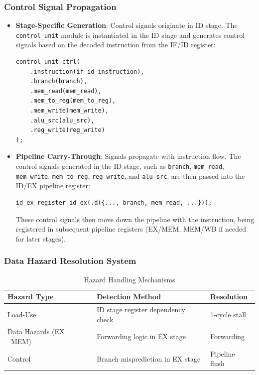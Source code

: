 \documentclass{article}
\numberwithin{figure}{section}
\numberwithin{table}{section}
\begin{document}
\subsubsection{Control Signal Propagation}
\begin{itemize}
\item \textbf{Stage-Specific Generation}: Control signals originate in ID stage. The \texttt{control\_unit} module is instantiated in the ID stage and generates control signals based on the decoded instruction from the IF/ID register:
\begin{lstlisting}[style=verilog-style]
control_unit ctrl(
    .instruction(if_id_instruction),
    .branch(branch),
    .mem_read(mem_read),
    .mem_to_reg(mem_to_reg),
    .mem_write(mem_write),
    .alu_src(alu_src),
    .reg_write(reg_write)
);\end{lstlisting}

\item \textbf{Pipeline Carry-Through}: Signals propagate with instruction flow. The control signals generated in the ID stage, such as \texttt{branch}, \texttt{mem\_read}, \texttt{mem\_write}, \texttt{mem\_to\_reg}, \texttt{reg\_write}, and \texttt{alu\_src}, are then passed into the ID/EX pipeline register:
\begin{lstlisting}[style=verilog-style]
id_ex_register id_ex(.d({..., branch, mem_read, ...}));\end{lstlisting}
    These control signals then move down the pipeline with the instruction, being registered in subsequent pipeline registers (EX/MEM, MEM/WB if needed for later stages).
\end{itemize}
\subsubsection{Data Hazard Resolution System}
\begin{table}[H]
\centering
\caption{Hazard Handling Mechanisms}
\begin{tabular}{lll}
\textbf{Hazard Type} & \textbf{Detection Method} & \textbf{Resolution} \\
\hline
Load-Use & ID stage register dependency check & 1-cycle stall \\
Data Hazards (EX \ MEM) & Forwarding logic in EX stage & Forwarding \\
Control & Branch misprediction in EX stage & Pipeline flush \\
\end{tabular}
\end{table}
\end{document}
